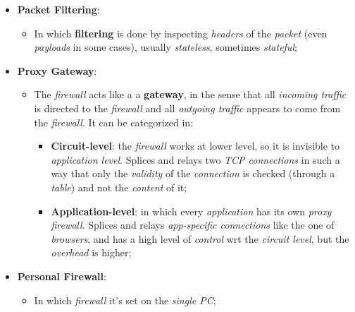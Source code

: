 \documentclass{article}
\begin{document}
\begin{itemize}
\item \textbf{Packet Filtering}:
\begin{itemize}
\item In which \textbf{filtering} is done by inspecting \emph{headers} of the \emph{packet} (even \emph{payloads} in some cases), usually \emph{stateless}, sometimes \emph{stateful}; 
\end{itemize}
\item \textbf{Proxy Gateway}:
\begin{itemize}
\item The \emph{firewall} acts like a a \textbf{gateway}, in the sense that all \emph{incoming traffic} is directed to the \emph{firewall} and all \emph{outgoing traffic} appears to come from the \emph{firewall}. It can be categorized in:
\begin{itemize}
\item \textbf{Circuit-level}: the \emph{firewall} works at lower level, so it is invisible to \emph{application level}. Splices and relays two \emph{TCP connections} in such a way that only the \emph{validity} of the \emph{connection} is checked (through a \emph{table}) and not the \emph{content} of it;
\item \textbf{Application-level}: in which every \emph{application} has its own \emph{proxy firewall}. Splices and relays \emph{app-specific connections} like the one of \emph{browsers}, and has a high level of \emph{control} wrt the \emph{circuit level}, but the \emph{overhead} is higher;
\end{itemize}
\end{itemize}
\item \textbf{Personal Firewall}:
\begin{itemize}
\item In which \emph{firewall} it's set on the \emph{single PC};
\end{itemize}
\end{itemize}
\end{document}
